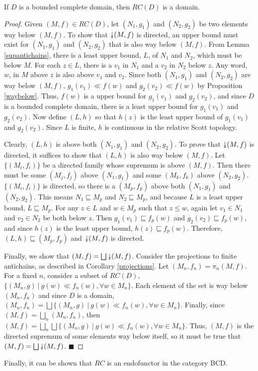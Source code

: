 \begin{proposition}
If $D$ is a bounded complete domain, then $RC(D)$ is a domain.
\end{proposition}
\begin{proof}
Given $(M,f)\in RC(D)$, let $(N_1,g_1)$ and $(N_2,g_2)$ be two elements way below $(M,f)$.  To show that $\Da (M,f)$ is directed, an upper bound must exist for $(N_1,g_1)$ and $(N_2,g_2)$ that is also way below $(M,f)$.  From Lemma \ref{supantichains}, there is a least upper bound, $L$, of $N_1$ and $N_2$, which must be below $M$.  For each $z\in L$, there is a $v_1$ in $N_1$ and a $v_2$ in $N_2$ below $z$.  Any word, $w$, in $M$ above $z$ is also above $v_1$ and $v_2$.  Since both $(N_1,g_1)$ and $(N_2,g_2)$ are way below $(M,f)$, $g_1(v_1) \ll f(w)$ and $g_2(v_2) \ll f(w)$ by Proposition \ref{waybelow}.  Thus, $f(w)$ is a upper bound for $g_1(v_1)$ and $g_2(v_2)$, and since $D$ is a bounded complete domain, there is a least upper bound for $g_1(v_1)$ and $g_2(v_2)$.  Now define $(L,h)$ so that $h(z)$ is the least upper bound of $g_1(v_1)$ and $g_2(v_2)$.  Since $L$ is finite, $h$ is continuous in the relative Scott topology.

Clearly, $(L,h)$ is above both $(N_1,g_1)$ and $(N_2,g_2)$.  To prove that $\Da (M,f)$ is directed, it suffices to show that $(L,h)$ is also way below $(M,f)$.  Let $\{(M_i, f_i)\}$ be a directed family whose supremum is above $(M,f)$.  Then there must be some $(M_j,f_j)$ above $(N_1,g_1)$ and some $(M_k,f_k)$ above $(N_2,g_2)$. $\{(M_i, f_i)\}$ is directed, so there is a $(M_p,f_p)$ above both $(N_1,g_1)$ and $(N_2,g_2)$.  This means $N_1\sqsubseteq M_p$ and $N_2\sqsubseteq M_p$, and because $L$ is a least upper bound, $L\sqsubseteq M_p$.  For any $z\in L$ and $w\in M_p$ such that $z\leq w$, again let $v_1\in N_1$ and $v_2\in N_2$ be both below $z$.  Then $g_1(v_1) \sqsubseteq f_p(w)$ and $g_2(v_2)\sqsubseteq f_p(w)$, and since $h(z)$ is the least upper bound, $h(z)\sqsubseteq f_p(w)$.  Therefore, $(L,h)\sqsubseteq (M_p,f_p)$ and $\Da (M,f)$ is directed.

Finally, we show that $(M,f) = \bigsqcup \Da (M,f)$.  Consider the projections to finite antichains, as described in Corollary \ref{projections}.  Let $(M_n, f_n) = \pi_n(M,f)$.  For a fixed $n$, consider a subset of $RC(D)$,  $\{(M_n, g)\ |\ g(w)\ll f_n(w), \forall w\in M_n\}$.  Each element of the set is way below $(M_n, f_n)$ and since $D$ is a domain, $(M_n, f_n) = \bigsqcup \{(M_n, g)\  |\ g(w)\ll f_n(w), \forall w\in M_n\}$.  Finally, since $(M,f) = \bigsqcup_{n} (M_n,f_n)$, then $(M,f) = \bigsqcup_{n} \bigsqcup \{(M_n, g)\ |\ g(w)\ll f_n(w), \forall w\in M_n\}$.  Thus, $(M,f)$ is the directed supremum of some elements way below itself, so it must be true that $(M,f) = \bigsqcup \Da (M,f)$. 
\hfill $\blacksquare$
\end{proof}
Finally, it can be shown that $RC$ is an endofunctor in the category \textsf{BCD}.

